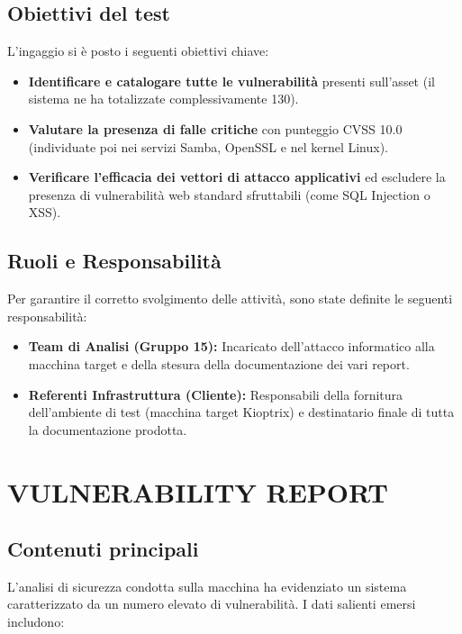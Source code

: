 \documentclass[12pt, a4paper]{article}
\begin{document}
	\subsection{Obiettivi del test}
	L'ingaggio si è posto i seguenti obiettivi chiave:
	\begin{itemize}
		\item \textbf{Identificare e catalogare tutte le vulnerabilità} presenti sull'asset (il sistema ne ha totalizzate complessivamente 130).
		\item \textbf{Valutare la presenza di falle critiche} con punteggio CVSS 10.0 (individuate poi nei servizi Samba, OpenSSL e nel kernel Linux).
		\item \textbf{Verificare l'efficacia dei vettori di attacco applicativi} ed escludere la presenza di vulnerabilità web standard sfruttabili (come SQL Injection o XSS).
	\end{itemize}

	\subsection{Ruoli e Responsabilità}

	Per garantire il corretto svolgimento delle attività, sono state definite le seguenti responsabilità:

	\begin{itemize}
		\item \textbf{Team di Analisi (Gruppo 15):} Incaricato dell'attacco informatico alla macchina target e della stesura della documentazione dei vari report.
		\item \textbf{Referenti Infrastruttura (Cliente):} Responsabili della fornitura dell'ambiente di test (macchina target Kioptrix) e destinatario finale di tutta la documentazione prodotta. 
	\end{itemize}


	\newpage
	\section{VULNERABILITY REPORT}

	\subsection{Contenuti principali}

	L'analisi di sicurezza condotta sulla macchina ha evidenziato un sistema caratterizzato da un numero elevato di vulnerabilità. I dati salienti emersi includono:
\end{document}
